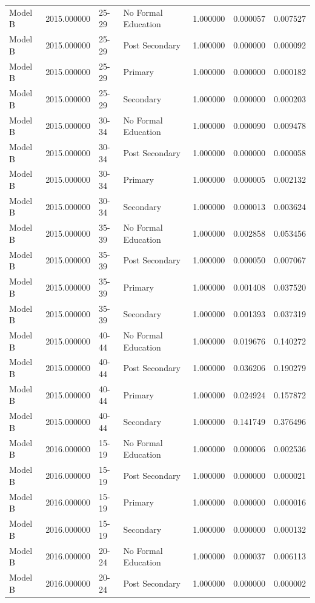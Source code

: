 \begin{table}[ht]
\begin{tabular}{lrllrrr}
Model B & 2015.000000 & 25-29 & No Formal Education & 1.000000 & 0.000057 & 0.007527 \\
Model B & 2015.000000 & 25-29 & Post Secondary & 1.000000 & 0.000000 & 0.000092 \\
Model B & 2015.000000 & 25-29 & Primary & 1.000000 & 0.000000 & 0.000182 \\
Model B & 2015.000000 & 25-29 & Secondary & 1.000000 & 0.000000 & 0.000203 \\
Model B & 2015.000000 & 30-34 & No Formal Education & 1.000000 & 0.000090 & 0.009478 \\
Model B & 2015.000000 & 30-34 & Post Secondary & 1.000000 & 0.000000 & 0.000058 \\
Model B & 2015.000000 & 30-34 & Primary & 1.000000 & 0.000005 & 0.002132 \\
Model B & 2015.000000 & 30-34 & Secondary & 1.000000 & 0.000013 & 0.003624 \\
Model B & 2015.000000 & 35-39 & No Formal Education & 1.000000 & 0.002858 & 0.053456 \\
Model B & 2015.000000 & 35-39 & Post Secondary & 1.000000 & 0.000050 & 0.007067 \\
Model B & 2015.000000 & 35-39 & Primary & 1.000000 & 0.001408 & 0.037520 \\
Model B & 2015.000000 & 35-39 & Secondary & 1.000000 & 0.001393 & 0.037319 \\
Model B & 2015.000000 & 40-44 & No Formal Education & 1.000000 & 0.019676 & 0.140272 \\
Model B & 2015.000000 & 40-44 & Post Secondary & 1.000000 & 0.036206 & 0.190279 \\
Model B & 2015.000000 & 40-44 & Primary & 1.000000 & 0.024924 & 0.157872 \\
Model B & 2015.000000 & 40-44 & Secondary & 1.000000 & 0.141749 & 0.376496 \\
Model B & 2016.000000 & 15-19 & No Formal Education & 1.000000 & 0.000006 & 0.002536 \\
Model B & 2016.000000 & 15-19 & Post Secondary & 1.000000 & 0.000000 & 0.000021 \\
Model B & 2016.000000 & 15-19 & Primary & 1.000000 & 0.000000 & 0.000016 \\
Model B & 2016.000000 & 15-19 & Secondary & 1.000000 & 0.000000 & 0.000132 \\
Model B & 2016.000000 & 20-24 & No Formal Education & 1.000000 & 0.000037 & 0.006113 \\
Model B & 2016.000000 & 20-24 & Post Secondary & 1.000000 & 0.000000 & 0.000002 \\

\end{tabular}
\end{table}

